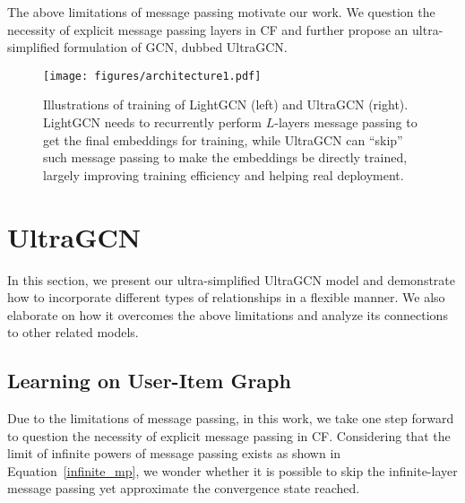 \documentclass[sigconf,authorversion]{acmart}
\begin{document}
The above limitations of message passing motivate our work. We question the necessity of explicit message passing layers in CF and further propose an ultra-simplified formulation of GCN, dubbed UltraGCN. 

\begin{figure}[!t]
	\centering
	\texttt{[image: figures/architecture1.pdf]}\caption{Illustrations of training of LightGCN (left) and UltraGCN (right). LightGCN needs to recurrently perform $L$-layers message passing to get the final embeddings for training, while UltraGCN can ``skip'' such message passing to make the embeddings be directly trained, largely improving training efficiency and helping real deployment.}\label{architecture}
\end{figure}








\section{U\lowercase{ltra}GCN}

In this section, we present our ultra-simplified UltraGCN model and 
demonstrate how to incorporate different types of relationships in a flexible manner. We also elaborate on how it overcomes the above limitations and analyze its connections to other related models.


\subsection{Learning on User-Item Graph}
\label{learning_on_ui}


Due to the limitations of message passing, in this work, we take one step forward to question the necessity of explicit message passing in CF. Considering that the limit of infinite powers of message passing exists as shown in Equation~\ref{infinite_mp}, we wonder whether it is possible to skip the infinite-layer message passing yet approximate the convergence state reached. 
\end{document}
